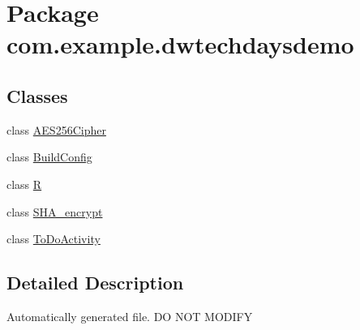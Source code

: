 \hypertarget{namespacecom_1_1example_1_1dwtechdaysdemo}{}\section{Package com.\+example.\+dwtechdaysdemo}
\label{namespacecom_1_1example_1_1dwtechdaysdemo}
\subsection*{Classes}
\begin{DoxyCompactItemize}
\item 
class \hyperlink{classcom_1_1example_1_1dwtechdaysdemo_1_1_a_e_s256_cipher}{A\+E\+S256\+Cipher}
\item 
class \hyperlink{classcom_1_1example_1_1dwtechdaysdemo_1_1_build_config}{Build\+Config}
\item 
class \hyperlink{classcom_1_1example_1_1dwtechdaysdemo_1_1_r}{R}
\item 
class \hyperlink{classcom_1_1example_1_1dwtechdaysdemo_1_1_s_h_a__encrypt}{S\+H\+A\+\_\+encrypt}
\item 
class \hyperlink{classcom_1_1example_1_1dwtechdaysdemo_1_1_to_do_activity}{To\+Do\+Activity}
\end{DoxyCompactItemize}


\subsection{Detailed Description}
Automatically generated file. DO N\+OT M\+O\+D\+I\+FY 